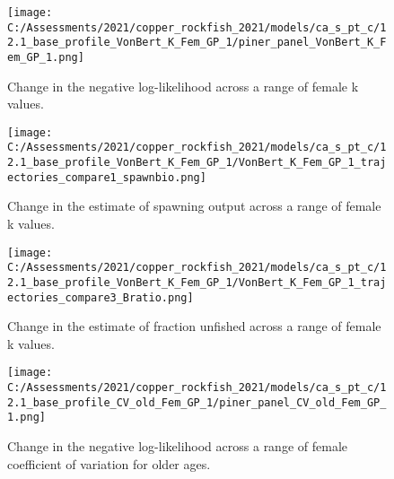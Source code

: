 \documentclass[11pt,
  english,
  a4paper,
]{article}
\begin{document}
\tagmcend\tagstructend


\begin{figure}
\centering
\texttt{[image: C:/Assessments/2021/copper\_rockfish\_2021/models/ca\_s\_pt\_c/12.1\_base\_profile\_VonBert\_K\_Fem\_GP\_1/piner\_panel\_VonBert\_K\_Fem\_GP\_1.png]}
\caption{Change in the negative log-likelihood across a range of female k values.\label{fig:k-profile}}
\end{figure}

\tagmcend\tagstructend


\begin{figure}
\centering
\texttt{[image: C:/Assessments/2021/copper\_rockfish\_2021/models/ca\_s\_pt\_c/12.1\_base\_profile\_VonBert\_K\_Fem\_GP\_1/VonBert\_K\_Fem\_GP\_1\_trajectories\_compare1\_spawnbio.png]}
\caption{Change in the estimate of spawning output across a range of female k values.\label{fig:k-ssb}}
\end{figure}

\tagmcend\tagstructend


\begin{figure}
\centering
\texttt{[image: C:/Assessments/2021/copper\_rockfish\_2021/models/ca\_s\_pt\_c/12.1\_base\_profile\_VonBert\_K\_Fem\_GP\_1/VonBert\_K\_Fem\_GP\_1\_trajectories\_compare3\_Bratio.png]}
\caption{Change in the estimate of fraction unfished across a range of female k values.\label{fig:k-depl}}
\end{figure}

\tagmcend\tagstructend


\begin{figure}
\centering
\texttt{[image: C:/Assessments/2021/copper\_rockfish\_2021/models/ca\_s\_pt\_c/12.1\_base\_profile\_CV\_old\_Fem\_GP\_1/piner\_panel\_CV\_old\_Fem\_GP\_1.png]}
\caption{Change in the negative log-likelihood across a range of female coefficient of variation for older ages.\label{fig:cv-profile}}
\end{figure}
\end{document}
